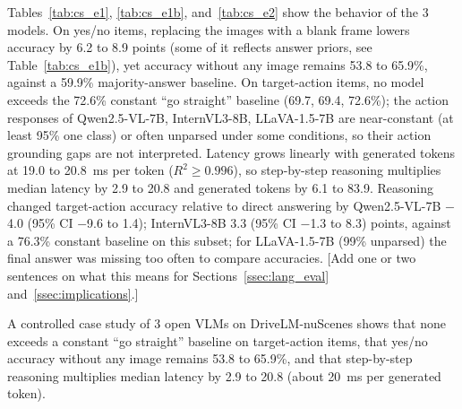 Tables~\ref{tab:cs_e1}, \ref{tab:cs_e1b}, and~\ref{tab:cs_e2} show the behavior of the 3 models. On yes/no items, replacing the images with a blank frame lowers accuracy by 6.2 to 8.9 points (some of it reflects answer priors, see Table~\ref{tab:cs_e1b}), yet accuracy without any image remains 53.8 to 65.9\%, against a 59.9\% majority-answer baseline. On target-action items, no model exceeds the 72.6\% constant ``go straight'' baseline (69.7, 69.4, 72.6\%); the action responses of Qwen2.5-VL-7B, InternVL3-8B, LLaVA-1.5-7B are near-constant (at least 95\% one class) or often unparsed under some conditions, so their action grounding gaps are not interpreted. Latency grows linearly with generated tokens at 19.0 to 20.8~ms per token ($R^2\ge0.996$), so step-by-step reasoning multiplies median latency by 2.9 to 20.8 and generated tokens by 6.1 to 83.9. Reasoning changed target-action accuracy relative to direct answering by Qwen2.5-VL-7B $-$4.0 (95\% CI $-$9.6 to 1.4); InternVL3-8B 3.3 (95\% CI $-$1.3 to 8.3) points, against a 76.3\% constant baseline on this subset; for LLaVA-1.5-7B (99\% unparsed) the final answer was missing too often to compare accuracies. [Add one or two sentences on what this means for Sections~\ref{ssec:lang_eval} and~\ref{ssec:implications}.]

A controlled case study of 3 open VLMs on DriveLM-nuScenes shows that none exceeds a constant ``go straight'' baseline on target-action items, that yes/no accuracy without any image remains 53.8 to 65.9\%, and that step-by-step reasoning multiplies median latency by 2.9 to 20.8 (about 20~ms per generated token).
